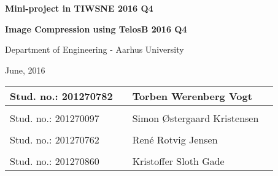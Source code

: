 
\centerline{\Huge\bfseries\color{ThemeColor} Mini-project in TIWSNE 2016 Q4}


\vspace{1em}
\centerline{\Large\bfseries\color{BlackColor} Image Compression using TelosB 2016 Q4}


\vspace{5em}
\centerline{\large\bfseries\color{BlackColor}}
\centerline{\large\color{BlackColor}Department of Engineering - Aarhus University}

\vspace{0.5em}
\centerline{\large\color{BlackColor} June, 2016}

\vspace{25em}

\begin{center}
   \begin{tabular}{ l p{3cm} l l }
   Stud. no.: 201270782 && Torben Werenberg Vogt & \\\hline
   & & \\
   Stud. no.: 201270097 && Simon Østergaard Kristensen & \\\hline
   & & \\
   Stud. no.: 201270762 && René Rotvig Jensen & \\\hline
   & & \\
   Stud. no.: 201270860 && Kristoffer Sloth Gade & \\\hline
   \end{tabular}
\end{center}
\thispagestyle{empty} %
\restoregeometry

